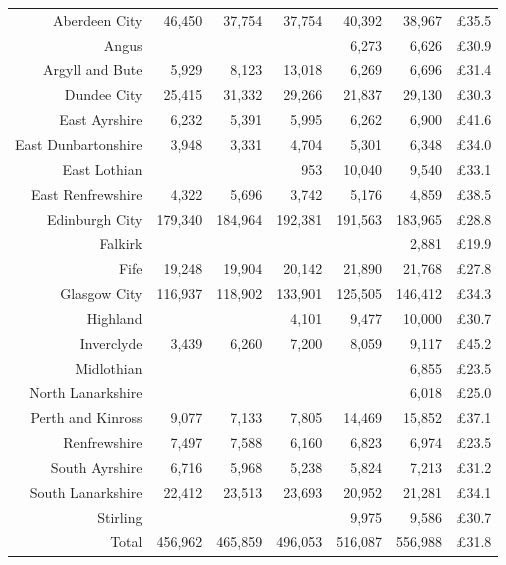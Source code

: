 \documentclass[
  12pt,
]{article}
\begin{document}
\begin{longtable}[t]{rrrrrrr}
\endfoot
\bottomrule
\endlastfoot
Aberdeen City & 46,450 & 37,754 & 37,754 & 40,392 & 38,967 & £35.5\\
Angus &  &  &  & 6,273 & 6,626 & £30.9\\
Argyll and Bute & 5,929 & 8,123 & 13,018 & 6,269 & 6,696 & £31.4\\
Dundee City & 25,415 & 31,332 & 29,266 & 21,837 & 29,130 & £30.3\\
East Ayrshire & 6,232 & 5,391 & 5,995 & 6,262 & 6,900 & £41.6\\
East Dunbartonshire & 3,948 & 3,331 & 4,704 & 5,301 & 6,348 & £34.0\\
East Lothian &  &  & 953 & 10,040 & 9,540 & £33.1\\
East Renfrewshire & 4,322 & 5,696 & 3,742 & 5,176 & 4,859 & £38.5\\
Edinburgh City & 179,340 & 184,964 & 192,381 & 191,563 & 183,965 & £28.8\\
Falkirk &  &  &  &  & 2,881 & £19.9\\
Fife & 19,248 & 19,904 & 20,142 & 21,890 & 21,768 & £27.8\\
Glasgow City & 116,937 & 118,902 & 133,901 & 125,505 & 146,412 & £34.3\\
Highland &  &  & 4,101 & 9,477 & 10,000 & £30.7\\
Inverclyde & 3,439 & 6,260 & 7,200 & 8,059 & 9,117 & £45.2\\
Midlothian &  &  &  &  & 6,855 & £23.5\\
North Lanarkshire &  &  &  &  & 6,018 & £25.0\\
Perth and Kinross & 9,077 & 7,133 & 7,805 & 14,469 & 15,852 & £37.1\\
Renfrewshire & 7,497 & 7,588 & 6,160 & 6,823 & 6,974 & £23.5\\
South Ayrshire & 6,716 & 5,968 & 5,238 & 5,824 & 7,213 & £31.2\\
South Lanarkshire & 22,412 & 23,513 & 23,693 & 20,952 & 21,281 & £34.1\\
Stirling &  &  &  & 9,975 & 9,586 & £30.7\\
\midrule
Total & 456,962 & 465,859 & 496,053 & 516,087 & 556,988 & £31.8\\*
\end{longtable}
\endgroup{}
\newpage
\begingroup\fontsize{10}{12}\selectfont
\end{document}
